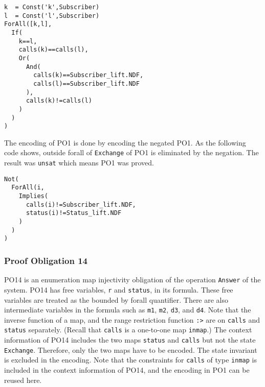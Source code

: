 \begin{mdframed}[roundcorner=5pt,shadow=true]
\begin{Verbatim}[fontsize=\small]
k  = Const('k',Subscriber)
l  = Const('l',Subscriber)
ForAll([k,l],
  If(
    k==l,
    calls(k)==calls(l),
    Or(
      And(
        calls(k)==Subscriber_lift.NDF,
        calls(l)==Subscriber_lift.NDF
      ),
      calls(k)!=calls(l)
    )
  )
)
\end{Verbatim}
\end{mdframed}

The encoding of PO1 is done by encoding the negated PO1. As the following code shows, outside forall of {\tt Exchange} of PO1 is eliminated by the negation. The result was {\tt unsat} which means PO1 was proved.



\begin{mdframed}[roundcorner=5pt,shadow=true]
\begin{Verbatim}[fontsize=\small]
Not(
  ForAll(i,
    Implies(
      calls(i)!=Subscriber_lift.NDF,
      status(i)!=Status_lift.NDF
    )
  )
)
\end{Verbatim}
\end{mdframed}


\subsubsection{Proof Obligation 14}

PO14 is an enumeration map injectivity obligation of the operation {\tt Answer} of the system. PO14 has free variables, {\tt r} and {\tt status}, in its formula. These free variables are treated as the bounded by forall quantifier. There are also intermediate variables in the formula such as {\tt m1}, {\tt m2}, {\tt d3}, and {\tt d4}. Note that the inverse function of a map, and the range restriction function {\tt :>} are on {\tt calls} and {\tt status} separately. (Recall that {\tt calls} is a one-to-one map {\tt inmap}.) The context information of PO14 includes the two maps {\tt status} and {\tt calls} but not the state {\tt Exchange}. Therefore, only the two maps have to be encoded. The state invariant is excluded in the encoding. Note that the constraints for {\tt calls} of type {\tt inmap} is included in the context information of PO14, and the encoding in PO1 can be reused here.

